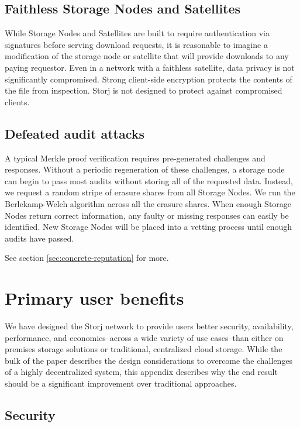 \documentclass[8pt,fleqn,openany]{book}
\begin{document}
\section{Faithless Storage Nodes and Satellites}

While Storage Nodes and Satellites are built to require authentication via
signatures before serving download requests, it is reasonable to imagine a
modification of the storage node or satellite that will provide downloads to
any paying requestor.
Even in a network with a faithless satellite, data privacy is not significantly
compromised.
Strong client-side encryption protects the contents of the file from
inspection.
Storj is not designed to protect against compromised clients.

\section{Defeated audit attacks}

A typical Merkle proof verification requires pre-generated challenges and
responses.
Without a periodic regeneration of these challenges, a storage node can begin
to pass most audits without storing all of the requested data.
Instead, we request a random stripe of erasure shares from all Storage Nodes.
We run the Berlekamp-Welch algorithm\cite{bw} across all the
erasure shares.
When enough Storage Nodes return correct information, any faulty or missing
responses can easily be identified.
New Storage Nodes will be placed into a vetting process until enough audits
have passed.

See section \ref{sec:concrete-reputation} for more.

\chapter{Primary user benefits}

We have designed the Storj network to provide users better security,
availability, performance, and economics--across a wide variety of use
cases--than either on premises storage solutions or traditional, centralized
cloud storage. While the bulk of the paper describes the design considerations
to overcome the challenges of a highly decentralized system, this appendix
describes why the end result should be a significant improvement over
traditional approaches.

\section{Security}
\end{document}
